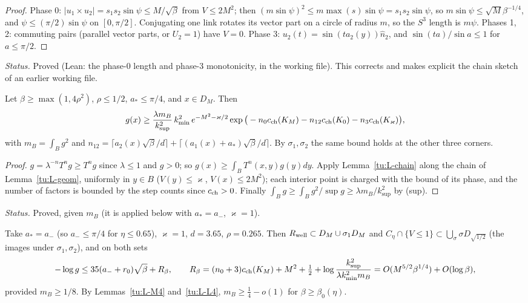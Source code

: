 \begin{proof}
Phase 0: $|u_1\times u_2|=s_1s_2\sin\psi\le M/\sqrt\beta$ from $V\le2M^2$; then $(m\sin\psi)^2\le m\max(s)\sin\psi=s_1s_2\sin\psi$,
so $m\sin\psi\le\sqrt M\beta^{-1/4}$, and $\psi\le(\pi/2)\sin\psi$ on $[0,\pi/2]$. Conjugating one link rotates its vector part
on a circle of radius $m$, so the $S^3$ length is $m\psi$. Phases 1, 2: commuting pairs (parallel vector parts, or $U_2=1$) have
$V=0$. Phase 3: $u_2(t)=\sin(ta_2(y))\hat n_2$, and $\sin(ta)/\sin a\le1$ for $a\le\pi/2$.
\end{proof}

\noindent\emph{Status.} Proved (Lean: the phase-0 length and phase-3 monotonicity, in the working file). This corrects
and makes explicit the chain sketch of an earlier working file.

\begin{theorem}[H4]\label{tu:L-H4}
Let $\beta\ge\max(1,4\rho^2)$, $\rho\le1/2$, $a_*\le\pi/4$, and $x\in D_M$. Then
\[
g(x)\ge\frac{\lambda m_B}{k_{\sup}^2}\,k_{\min}^2\,e^{-M^2-\varkappa/2}\exp\big(-n_0c_{\rm ch}(K_M)-n_{12}c_{\rm ch}(K_0)-n_3c_{\rm ch}(K_\varkappa)\big),
\]
with $m_B=\int_Bg^2$ and $n_{12}=\lceil a_2(x)\sqrt\beta/d\rceil+\lceil(a_1(x)+a_*)\sqrt\beta/d\rceil$. By $\sigma_1,\sigma_2$ the same
bound holds at the other three corners.
\end{theorem}

\begin{proof}
$g=\lambda^{-n}T^ng\ge T^ng$ since $\lambda\le1$ and $g>0$; so $g(x)\ge\int_BT^n(x,y)g(y)dy$. Apply Lemma~\ref{tu:L-chain}
along the chain of Lemma~\ref{tu:L-geom}, uniformly in $y\in B$ ($V(y)\le\varkappa$, $V(x)\le2M^2$); each interior point is
charged with the bound of its phase, and the number of factors is bounded by the step counts since $c_{\rm ch}>0$. Finally
$\int_Bg\ge\int_Bg^2/\sup g\ge\lambda m_B/k_{\sup}^2$ by (sup).
\end{proof}

\noindent\emph{Status.} Proved, given $m_B$ (it is applied below with $a_*=a_-$, $\varkappa=1$).

\begin{corollary}\label{tu:L-H4cor}
Take $a_*=a_-$ (so $a_-\le\pi/4$ for $\eta\le0.65$), $\varkappa=1$, $d=3.65$, $\rho=0.265$. Then
$R_{\rm well}\subset D_M\cup\sigma_1D_M$ and $C_\eta\cap\{V\le1\}\subset\bigcup_{\sigma}\sigma D_{\sqrt{1/2}}$ (the images under
$\sigma_1,\sigma_2$), and on both sets
\[
-\log g\le35(a_-+r_0)\sqrt\beta+R_\beta,\qquad R_\beta=(n_0+3)c_{\rm ch}(K_M)+M^2+\tfrac12+\log\frac{k_{\sup}^2}{\lambda k_{\min}^2m_B}
=O(M^{5/2}\beta^{1/4})+O(\log\beta),
\]
provided $m_B\ge1/8$. By Lemmas~\ref{tu:L-M4} and~\ref{tu:L-L4}, $m_B\ge\frac14-o(1)$ for $\beta\ge\beta_0(\eta)$.
\end{corollary}

